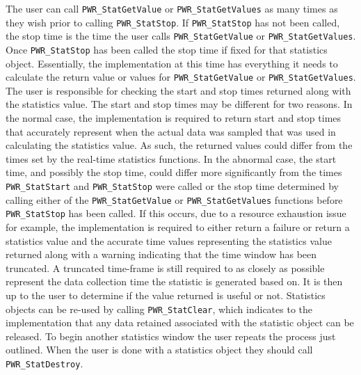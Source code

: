 The user can call \texttt{PWR_StatGetValue} or \texttt{PWR_StatGetValues} as many times as they wish prior to calling \texttt{PWR_StatStop}.
If \texttt{PWR_StatStop} has not been called, the stop time is the time the user calls \texttt{PWR_StatGetValue} or \texttt{PWR_StatGetValues}.
Once \texttt{PWR_StatStop} has been called the stop time if fixed for that statistics object. 
Essentially, the implementation at this time has everything it needs to calculate the return value or values for \texttt{PWR_StatGetValue} or \texttt{PWR_StatGetValues}.
The user is responsible for checking the start and stop times returned along with the statistics value. 
The start and stop times may be different for two reasons.
In the normal case, the implementation is required to return start and stop times that accurately represent when the actual data was sampled that was used in calculating the statistics value.
As such, the returned values could differ from the times set by the real-time statistics functions.
In the abnormal case, the start time, and possibly the stop time, could differ more significantly from the times \texttt{PWR_StatStart} and \texttt{PWR_StatStop} were called or the stop time determined by calling either of the \texttt{PWR_StatGetValue} or \texttt{PWR_StatGetValues} functions before \texttt{PWR_StatStop} has been called. 
If this occurs, due to a resource exhaustion issue for example, the implementation is required to either return a failure or return a statistics value and the accurate time values representing the statistics value returned along with a warning indicating that the time window has been truncated. 
A truncated time-frame is still required to as closely as possible represent the data collection time the statistic is generated based on.
It is then up to the user to determine if the value returned is useful or not.
Statistics objects can be re-used by calling \texttt{PWR_StatClear}, which indicates to the implementation that any data retained associated with the statistic object can be released. 
To begin another statistics window the user repeats the process just outlined.
When the user is done with a statistics object they should call \texttt{PWR_StatDestroy}.

